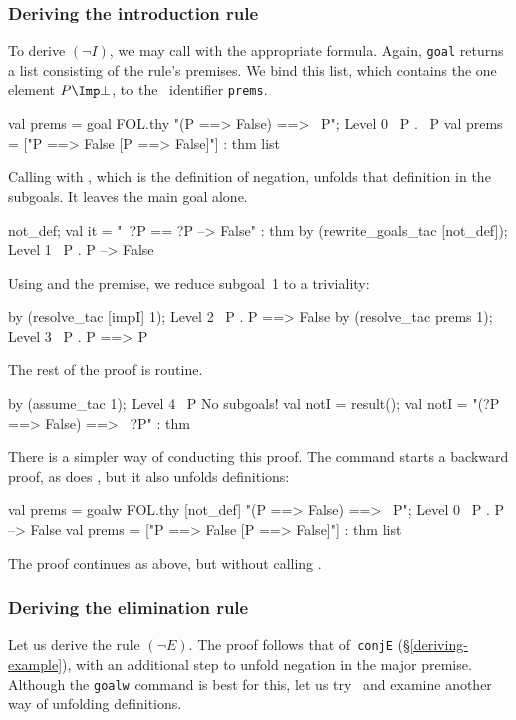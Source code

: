 \subsubsection{Deriving the introduction rule}
To derive $(\neg I)$, we may call  with the appropriate
formula.  Again, {\tt goal} returns a list consisting of the rule's
premises.  We bind this list, which contains the one element $P\Imp\bot$,
to the \ML\ identifier {\tt prems}.
\begin{ttbox}
val prems = goal FOL.thy "(P ==> False) ==> ~P";
{\out Level 0}
{\out ~P}
{. ~P}
{\out val prems = ["P ==> False  [P ==> False]"] : thm list}
\end{ttbox}
Calling  with , which is the
definition of negation, unfolds that definition in the subgoals.  It leaves
the main goal alone.
\begin{ttbox}
not_def;
{\out val it = "~?P == ?P --> False" : thm}
by (rewrite_goals_tac [not_def]);
{\out Level 1}
{\out ~P}
{. P --> False}
\end{ttbox}
Using  and the premise, we reduce subgoal~1 to a triviality:
\begin{ttbox}
by (resolve_tac [impI] 1);
{\out Level 2}
{\out ~P}
{. P ==> False}
\ttbreak
by (resolve_tac prems 1);
{\out Level 3}
{\out ~P}
{. P ==> P}
\end{ttbox}
The rest of the proof is routine.
\begin{ttbox}
by (assume_tac 1);
{\out Level 4}
{\out ~P}
{\out No subgoals!}
val notI = result();
{\out val notI = "(?P ==> False) ==> ~?P" : thm}
\end{ttbox}

\medskip
There is a simpler way of conducting this proof.  The 
command starts a backward proof, as does , but it also
unfolds definitions:
\begin{ttbox}
val prems = goalw FOL.thy [not_def]
    "(P ==> False) ==> ~P";
{\out Level 0}
{\out ~P}
{. P --> False}
{\out val prems = ["P ==> False  [P ==> False]"] : thm list}
\end{ttbox}
The proof continues as above, but without calling .


\subsubsection{Deriving the elimination rule}
Let us derive the rule $(\neg E)$.  The proof follows that of~{\tt conjE}
(\S\ref{deriving-example}), with an additional step to unfold negation in
the major premise.  Although the {\tt goalw} command is best for this, let
us try~ and examine another way of unfolding definitions.

